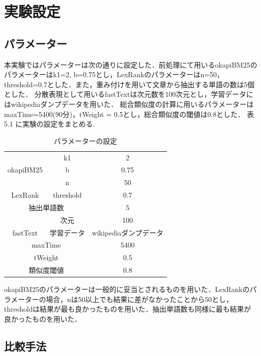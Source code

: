 \section{実験設定}
\label{exp:setting}
\subsection{パラメーター}
本実験ではパラメーターは次の通りに設定した．前処理にて用いるokapiBM25のパラメーターはk1=2, b=0.75とし，LexRankのパラメーターはn=50，threshold=0.7とした．また，重み付けを用いて文章から抽出する単語の数は5個とした．
分散表現として用いるfastTextは次元数を100次元とし，学習データにはwikipediaダンプデータを用いた．
総合類似度の計算に用いるパラメーターはmaxTime=5400(90分)，tWeight = 0.5とし，総合類似度の閾値は0.8とした．
表5.1 に実験の設定をまとめる.
\begin{table}[htbp]
\begin{center}
  \begin{tabular}{| c | c |  c |} \hline
      & k1 &  2 \\ \cline{2-3}
    okapiBM25 & b & 0.75 \\ \cline{2-3} \hline
     & n &  50 \\ \cline{2-3}
    LexRank & threshold & 0.7 \\ \cline{2-3} \hline
     \multicolumn{2}{|c|}{抽出単語数} & 5 \\  \hline
     & 次元 &  100 \\ \cline{2-3} 
    fastText & 学習データ & wikipediaダンプデータ \\ \cline{2-3} \hline
     \multicolumn{2}{|c|}{maxTime} & 5400 \\  \hline
     \multicolumn{2}{|c|}{tWeight} & 0.5 \\  \hline
     \multicolumn{2}{|c|}{類似度閾値} & 0.8 \\  \hline
  \end{tabular}
  \caption{パラメーターの設定}
  \label{table:par}
  \end{center}
\end{table}

okapiBM25のパラメーターは一般的に妥当とされる\cite{infoRetrieval}ものを用いた．LexRankのパラメーターの場合，nは50以上でも結果に差がなかったことから50とし，thresholdは結果が最も良かったものを用いた．抽出単語数も同様に最も結果が良かったものを用いた．

\subsection{比較手法}

